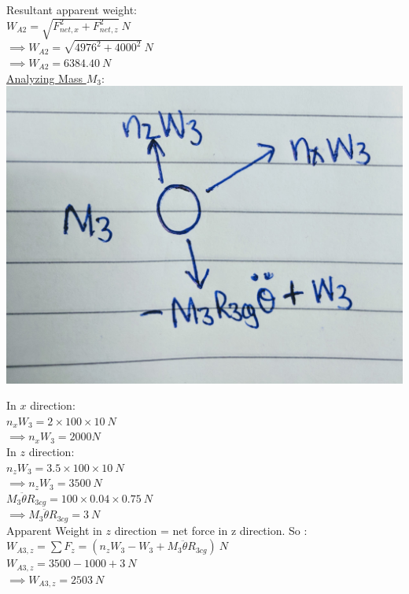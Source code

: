 \documentclass{article}
\begin{document}
\noindent Resultant apparent weight: \\
$W_{A2}= \sqrt{F_{net,x}^2+ F_{net,z}^2}\ N$\\
$\implies W_{A2}= \sqrt{4976^2+ 4000^2}\ N$\\
$\implies W_{A2}= 6384.40\ N$\\

\noindent \underline{Analyzing Mass $M_3$}:\\

\includegraphics[scale=0.05]{m3.jpg}

\noindent In $x$ direction:\\

\noindent $n_xW_3 = 2 \times 100 \times 10\ N$\\
$\implies n_xW_3= 2000 N $\\

\noindent In $z$ direction: \\

\noindent $n_zW_3= 3.5 \times 100 \times 10\ N$\\
$\implies n_zW_3 = 3500\ N$\\

\noindent $M_3\ddot{\theta}R_{3cg}=100 \times 0.04 \times 0.75\ N $\\
$\implies M_3\ddot{\theta}R_{3cg}= 3\ N $\\

\noindent Apparent Weight in $z$ direction = net force in z direction. So : \\
$W_{A3,z}=\sum F_z = (n_zW_3-W_3+ M_3\ddot{\theta}R_{3cg})\ N$\\
$W_{A3,z}= 3500-1000+3 \ N$\\
$\implies W_{A3,z}= 2503\ N$\\
\end{document}
